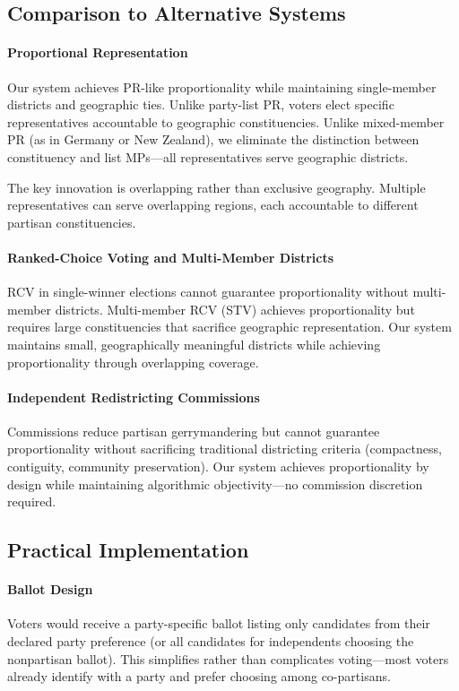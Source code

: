 \subsection{Comparison to Alternative Systems}

\paragraph{Proportional Representation}
Our system achieves PR-like proportionality while maintaining single-member districts and geographic ties. Unlike party-list PR, voters elect specific representatives accountable to geographic constituencies. Unlike mixed-member PR (as in Germany or New Zealand), we eliminate the distinction between constituency and list MPs---all representatives serve geographic districts.

The key innovation is overlapping rather than exclusive geography. Multiple representatives can serve overlapping regions, each accountable to different partisan constituencies.

\paragraph{Ranked-Choice Voting and Multi-Member Districts}
RCV in single-winner elections cannot guarantee proportionality without multi-member districts. Multi-member RCV (STV) achieves proportionality but requires large constituencies that sacrifice geographic representation. Our system maintains small, geographically meaningful districts while achieving proportionality through overlapping coverage.

\paragraph{Independent Redistricting Commissions}
Commissions reduce partisan gerrymandering but cannot guarantee proportionality without sacrificing traditional districting criteria (compactness, contiguity, community preservation). Our system achieves proportionality by design while maintaining algorithmic objectivity---no commission discretion required.

\subsection{Practical Implementation}

\paragraph{Ballot Design}
Voters would receive a party-specific ballot listing only candidates from their declared party preference (or all candidates for independents choosing the nonpartisan ballot). This simplifies rather than complicates voting---most voters already identify with a party and prefer choosing among co-partisans.

